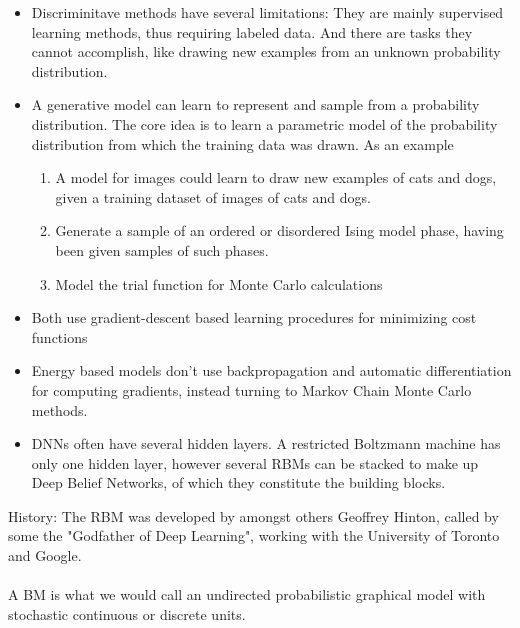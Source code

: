 \documentclass[%
oneside,                 %
final,                   %
10pt]{article}
\begin{document}
\begin{itemize}
\item Discriminitave methods have several limitations: They are mainly supervised learning methods, thus requiring labeled data. And there are tasks they cannot accomplish, like drawing new examples from an unknown probability distribution.

\item A generative model can learn to represent and sample from a probability distribution. The core idea is to learn a parametric model of the probability distribution from which the training data was drawn. As an example
\begin{enumerate}

 \item A model for images could learn to draw new examples of cats and dogs, given a training dataset of images of cats and dogs.

 \item Generate a sample of an ordered or disordered Ising model phase, having been given samples of such phases.

 \item Model the trial function for Monte Carlo calculations

\end{enumerate}

\noindent
\item Both use gradient-descent based learning procedures for minimizing cost functions

\item Energy based models don't use backpropagation and automatic differentiation for computing gradients, instead turning to Markov Chain Monte Carlo methods.

\item DNNs often have several hidden layers. A restricted Boltzmann machine has only one hidden layer, however several RBMs can be stacked to make up Deep Belief Networks, of which they constitute the building blocks.
\end{itemize}

\noindent
History: The RBM was developed by amongst others Geoffrey Hinton, called by some the "Godfather of Deep Learning", working with the University of Toronto and Google.


\paragraph{}
A BM is what we would call an undirected probabilistic graphical model
with stochastic continuous or discrete units.
\end{document}
